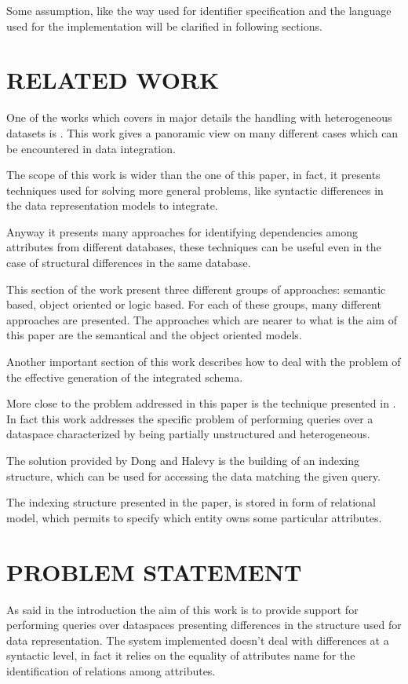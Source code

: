 \documentclass{acm_proc_article-sp-sigmod07}
\begin{document}
Some assumption, like the way used for identifier specification and the
language used for the implementation will be clarified in following
sections.

\section{RELATED WORK}
One of the works which covers in major details the handling with
heterogeneous datasets is \cite{kaufmann:integration}. This work gives a panoramic
view on many different cases which can be encountered in data integration.

The scope of this work is wider than the one of this paper, in fact, it
presents techniques used for solving more general problems, like syntactic
differences in the data representation models to integrate.

Anyway it presents many approaches for identifying dependencies among
attributes from different databases, these techniques can be useful even
in the case of structural differences in the same database.

This section of the work present three different groups of approaches:
semantic based, object oriented or logic based.
For each of these groups, many different approaches are presented.
The approaches which are nearer to what is the aim of this paper are the
semantical and the object oriented models.

Another important section of this work describes how to deal with the
problem of the effective generation of the integrated schema.

More close to the problem addressed in this paper is the technique
presented in \cite{dong:indexing}.
In fact this work addresses the specific problem of performing queries
over a dataspace characterized by being partially unstructured and
heterogeneous.

The solution provided by Dong and Halevy is the building of an indexing
structure, which can be used for accessing the data matching the given
query.

The indexing structure presented in the paper, is stored in form of
relational model, which permits to specify which entity owns some
particular attributes.

\section{PROBLEM STATEMENT}
As said in the introduction the aim of this work is to provide support for
performing queries over dataspaces presenting differences in the structure
used for data representation.
The system implemented doesn't deal with differences at a syntactic level,
in fact it relies on the equality of attributes name for the
identification of relations among attributes.
\end{document}
